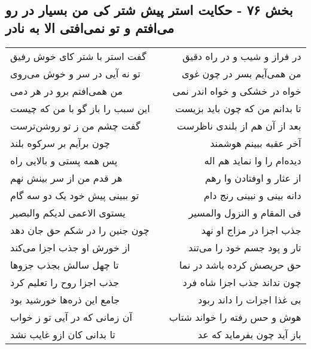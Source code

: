 \begin{center}
\section*{بخش ۷۶ - حکایت استر پیش شتر کی من بسیار در رو می‌افتم و تو نمی‌افتی الا به نادر}
\label{sec:sh076}
\begin{longtable}{l p{0.5cm} r}
گفت استر با شتر کای خوش رفیق
&&
در فراز و شیب و در راه دقیق
\\
تو نه آیی در سر و خوش می‌روی
&&
من همی‌آیم بسر در چون غوی
\\
من همی‌افتم برو در هر دمی
&&
خواه در خشکی و خواه اندر نمی
\\
این سبب را باز گو با من که چیست
&&
تا بدانم من که چون باید بزیست
\\
گفت چشم من ز تو روشن‌ترست
&&
بعد از آن هم از بلندی ناظرست
\\
چون برآیم بر سرکوه بلند
&&
آخر عقبه ببینم هوشمند
\\
پس همه پستی و بالایی راه
&&
دیده‌ام را وا نماید هم اله
\\
هر قدم من از سر بینش نهم
&&
از عثار و اوفتادن وا رهم
\\
تو ببینی پیش خود یک دو سه گام
&&
دانه بینی و نبینی رنج دام
\\
یستوی الاعمی لدیکم والبصیر
&&
فی المقام و النزول والمسیر
\\
چون جنین را در شکم حق جان دهد
&&
جذب اجزا در مزاج او نهد
\\
از خورش او جذب اجزا می‌کند
&&
تار و پود جسم خود را می‌تند
\\
تا چهل سالش بجذب جزوها
&&
حق حریصش کرده باشد در نما
\\
جذب اجزا روح را تعلیم کرد
&&
چون نداند جذب اجزا شاه فرد
\\
جامع این ذره‌ها خورشید بود
&&
بی غذا اجزات را داند ربود
\\
آن زمانی که در آیی تو ز خواب
&&
هوش و حس رفته را خواند شتاب
\\
تا بدانی کان ازو غایب نشد
&&
باز آید چون بفرماید که عد
\\
\end{longtable}
\end{center}
